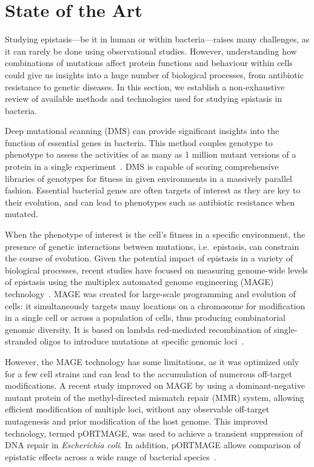 \documentclass[12pt]{article}
\begin{document}
  \section*{State of the Art}

  Studying epistasis---be it in human or within bacteria---raises many
  challenges, as it can rarely be done using observational studies. However,
  understanding how combinations of mutations affect protein functions and
  behaviour within cells could give us insights into a huge number of
  biological processes, from antibiotic resistance to genetic diseases. In this
  section, we establish a non-exhaustive review of available methods and
  technologies used for studying epistasis in bacteria.

  Deep mutational scanning (DMS) can provide significant insights into the
  function of essential genes in bacteria. This method couples genotype to
  phenotype to assess the activities of as many as 1 million mutant versions of
  a protein in a single experiment~\cite{fowler2014deep}. DMS is capable of
  scoring comprehensive libraries of genotypes for fitness in given
  environments in a massively parallel fashion. Essential bacterial genes are
  often targets of interest as they are key to their evolution, and can lead to
  phenotypes such as antibiotic resistance when mutated. 

  When the phenotype of interest is the cell's fitness in a specific
  environment, the presence of genetic interactions between mutations, i.e.\
  epistasis, can constrain the course of evolution. Given the potential impact
  of epistasis in a variety of biological processes, recent studies have
  focused on measuring genome-wide levels of epistasis using the multiplex
  automated genome engineering (MAGE) technology~\cite{wang2012}. MAGE was
  created for large-scale programming and evolution of cells: it simultaneously
  targets many locations on a chromosome for modification in a single cell or
  across a population of cells, thus producing combinatorial genomic diversity.
  It is based on lambda red-mediated recombination of single-stranded oligos to
  introduce mutations at specific genomic loci~\cite{wang2009programming}.

  However, the MAGE technology has some limitations, as it was optimized only
  for a few cell strains and can lead to the accumulation of numerous
  off-target modifications. A recent study improved on MAGE by using a
  dominant-negative mutant protein of the methyl-directed mismatch repair (MMR)
  system, allowing efficient modification of multiple loci, without
  any observable off-target mutagenesis and prior modification of the host
  genome. This improved technology, termed pORTMAGE, was used to achieve a
  transient suppression of DNA repair in \textit{Escherichia coli}. In
  addition, pORTMAGE allows comparison of epistatic effects across a wide range
  of bacterial species~\cite{nyerges2016highly}.
\end{document}
